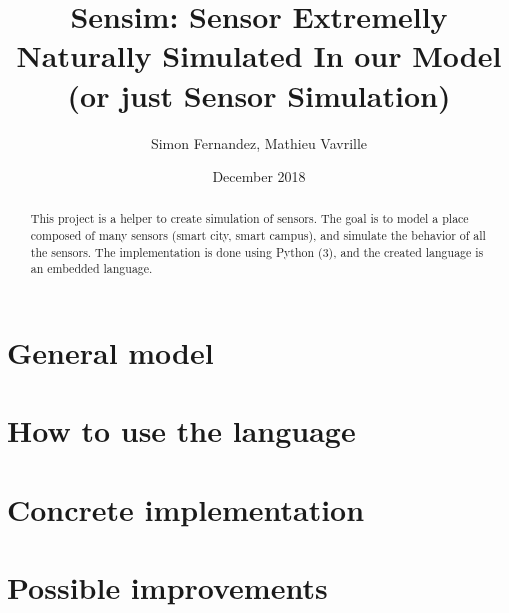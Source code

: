 \documentclass[a4paper,11pt]{article}
\title{Sensim: Sensor Extremelly Naturally Simulated In our Model (or just Sensor Simulation)}
\author{Simon Fernandez, Mathieu Vavrille}
\date{December 2018}
\begin{document}
\maketitle

\begin{abstract}
  This project is a helper to create simulation of sensors. The goal is to model a place composed of many sensors (smart city, smart campus), and simulate the behavior of all the sensors. The implementation is done using Python (3), and the created language is an embedded language.
\end{abstract}


\section{General model}





\section{How to use the language}







\section{Concrete implementation}






\section{Possible improvements}


\end{document}
